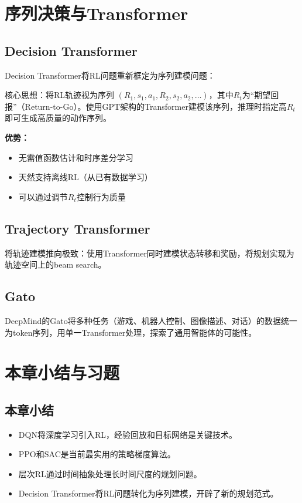 \section{序列决策与Transformer \grad}

\subsection{Decision Transformer}

Decision Transformer将RL问题重新框定为序列建模问题：

\begin{keypoint}
核心思想：将RL轨迹视为序列 $(R_1, s_1, a_1, R_2, s_2, a_2, \ldots)$，其中$R_t$为``期望回报''（Return-to-Go）。使用GPT架构的Transformer建模该序列，推理时指定高$R_t$即可生成高质量的动作序列。

\textbf{优势：}
\begin{itemize}
  \item 无需值函数估计和时序差分学习
  \item 天然支持离线RL（从已有数据学习）
  \item 可以通过调节$R_t$控制行为质量
\end{itemize}
\end{keypoint}

\subsection{Trajectory Transformer \self}

将轨迹建模推向极致：使用Transformer同时建模状态转移和奖励，将规划实现为轨迹空间上的beam search。

\subsection{Gato \self}

DeepMind的Gato将多种任务（游戏、机器人控制、图像描述、对话）的数据统一为token序列，用单一Transformer处理，探索了通用智能体的可能性。

\section{本章小结与习题}

\subsection*{本章小结}
\begin{itemize}
  \item DQN将深度学习引入RL，经验回放和目标网络是关键技术。
  \item PPO和SAC是当前最实用的策略梯度算法。
  \item 层次RL通过时间抽象处理长时间尺度的规划问题。
  \item Decision Transformer将RL问题转化为序列建模，开辟了新的规划范式。
\end{itemize}

